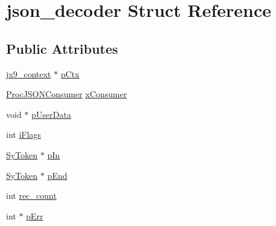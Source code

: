 \hypertarget{structjson__decoder}{\section{json\-\_\-decoder Struct Reference}
\label{dd/d82/structjson__decoder}
}
\subsection*{Public Attributes}
\begin{DoxyCompactItemize}
\item 
\hyperlink{structjx9__context}{jx9\-\_\-context} $\ast$ \hyperlink{structjson__decoder_a53557ea947ad365f6392faf0ed44e142}{p\-Ctx}
\item 
\hyperlink{unqlite_8c_a475042eea91870a59c696de95499268f}{Proc\-J\-S\-O\-N\-Consumer} \hyperlink{structjson__decoder_ad1a69c5f61827586c85b2a80b8ab6298}{x\-Consumer}
\item 
void $\ast$ \hyperlink{structjson__decoder_a5ff9bf9c85ccef00d58926a48c89b8b0}{p\-User\-Data}
\item 
int \hyperlink{structjson__decoder_a592ff18698cc277797bff869f68b5f52}{i\-Flags}
\item 
\hyperlink{struct_sy_token}{Sy\-Token} $\ast$ \hyperlink{structjson__decoder_a90a728942bc68c77fca12d3b17b8bf0d}{p\-In}
\item 
\hyperlink{struct_sy_token}{Sy\-Token} $\ast$ \hyperlink{structjson__decoder_aea2cd518ac21b28213cb52e1ce8e2ce8}{p\-End}
\item 
int \hyperlink{structjson__decoder_aa2218baa9735ff2110005cb272db3769}{rec\-\_\-count}
\item 
int $\ast$ \hyperlink{structjson__decoder_ad170065903ab041a5d4e1f1f7671b728}{p\-Err}
\end{DoxyCompactItemize}


